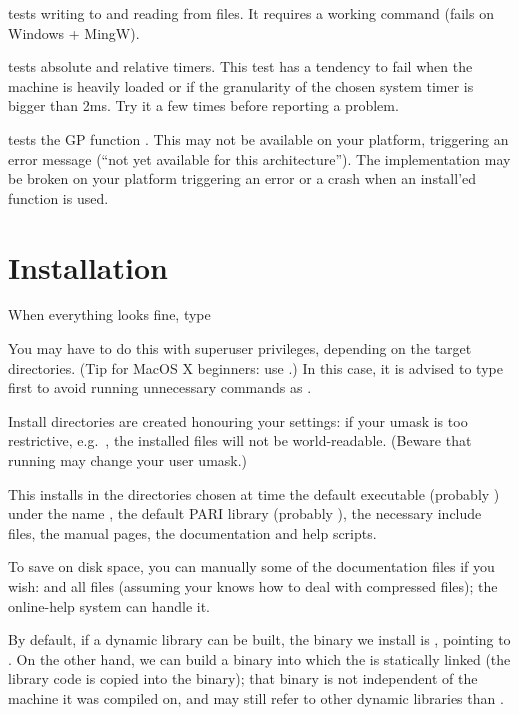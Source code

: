  tests writing to and reading from  files. It requires
a working  command (fails on Windows + MingW).

 tests absolute and relative timers. This test has a
tendency to fail when the machine is heavily loaded or if the granularity
of the chosen system timer is bigger than 2ms. Try it a few times before
reporting a problem.

 tests the GP function . This may not be
available on your platform, triggering an error message (``not yet available
for this architecture''). The implementation may be broken on your platform
triggering an error or a crash when an install'ed function is used.

\section{Installation} When everything looks fine, type


\noindent You may have to do this with superuser privileges, depending on the
target directories. (Tip for MacOS X beginners: use .)
In this case, it is advised to type  first to avoid running
unnecessary commands as .

 Install directories are created honouring your 
settings: if your umask is too restrictive, e.g.~, the installed
files will not be world-readable. (Beware that running  may change
your user umask.)

This installs in the directories chosen at  time the default
 executable (probably ) under the name , the
default PARI library (probably ), the necessary include
files, the manual pages, the documentation and help scripts.

To save on disk space, you can manually  some of the documentation
files if you wish:  and all  files (assuming your
 knows how to deal with compressed files); the online-help system
can handle it.

By default, if a dynamic library  can be built, the 
binary we install is , pointing to . On the other
hand, we can build a  binary into which the  is
statically linked (the library code is copied into the binary); that binary
is not independent of the machine it was compiled on, and may still refer to
other dynamic libraries than .

